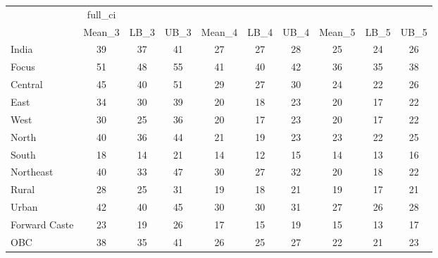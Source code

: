 \begin{tabular}{l*{9}{c}}
\toprule
                    &     full\_ci&            &            &            &            &            &            &            &            \\
                    &      Mean\_3&        LB\_3&        UB\_3&      Mean\_4&        LB\_4&        UB\_4&      Mean\_5&        LB\_5&        UB\_5\\
\midrule
India               &          39&          37&          41&          27&          27&          28&          25&          24&          26\\
Focus               &          51&          48&          55&          41&          40&          42&          36&          35&          38\\
Central             &          45&          40&          51&          29&          27&          30&          24&          22&          26\\
East                &          34&          30&          39&          20&          18&          23&          20&          17&          22\\
West                &          30&          25&          36&          20&          17&          23&          20&          17&          22\\
North               &          40&          36&          44&          21&          19&          23&          23&          22&          25\\
South               &          18&          14&          21&          14&          12&          15&          14&          13&          16\\
Northeast           &          40&          33&          47&          30&          27&          32&          20&          18&          22\\
Rural               &          28&          25&          31&          19&          18&          21&          19&          17&          21\\
Urban               &          42&          40&          45&          30&          30&          31&          27&          26&          28\\
Forward Caste       &          23&          19&          26&          17&          15&          19&          15&          13&          17\\
OBC                 &          38&          35&          41&          26&          25&          27&          22&          21&          23\\

\end{tabular}
